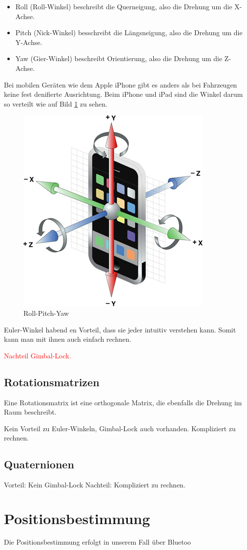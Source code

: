 \begin{itemize}
	\item Roll (Roll-Winkel) beschreibt die Querneigung, also die Drehung um die X-Achse.
	\item Pitch (Nick-Winkel) besschreibt die Längsneigung, also die Drehung um die Y-Achse.
	\item Yaw (Gier-Winkel) beschreibt Orientierung, also die Drehung um die Z-Achse.
\end{itemize}

Bei mobilen Geräten wie dem Apple iPhone gibt es anders als bei Fahrzeugen keine fest denifierte Ausrichtung. Beim iPhone und iPad sind die Winkel darum so verteilt wie auf Bild \ref{fig:apple-axes} zu sehen.

\begin{figure}[htb]
\centering
\includegraphics[scale=0.8]{figures/apple-axes}
\caption{Roll-Pitch-Yaw \cite{apple:001}}
\label{fig:apple-axes}
\end{figure}

Euler-Winkel habend en Vorteil, dass sie jeder intuitiv verstehen kann. Somit kann man mit ihnen auch einfach rechnen.

\textcolor{red}{Nachteil Gimbal-Lock.}

\subsection{Rotationsmatrizen}
Eine Rotationsmatrix ist eine orthogonale Matrix, die ebenfalls die Drehung im Raum beschreibt.

Kein Vorteil zu Euler-Winkeln, Gimbal-Lock auch vorhanden. Kompliziert zu rechnen.

\subsection{Quaternionen}
Vorteil: Kein Gimbal-Lock
Nachteil: Kompliziert zu rechnen.

\section{Positionsbestimmung}
Die Positionsbestimmung erfolgt in unserem Fall über Bluetoo